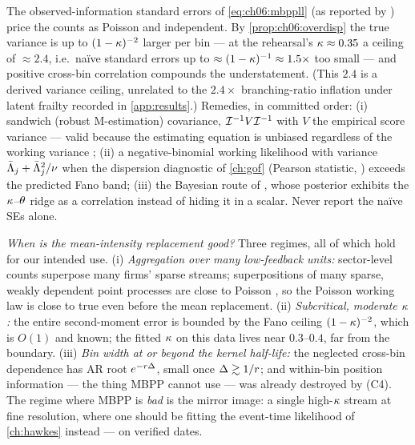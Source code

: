 \begin{warning}\label{warn:ch06:optimisticse}
The observed-information standard errors of \cref{eq:ch06:mbppll} (as
reported by ) price the counts as Poisson and
independent. By \cref{prop:ch06:overdisp} the true variance is up to
$(1-\kappa)^{-2}$ larger per bin --- at the rehearsal's
$\kappa\approx0.35$ a ceiling of $\approx 2.4$, i.e.\ na\"ive standard
errors up to $\approx (1-\kappa)^{-1}\approx1.5\times$ too small --- and
positive cross-bin correlation compounds the understatement. (This
$2.4$ is a derived variance ceiling, unrelated to the $2.4\times$
branching-ratio inflation under latent frailty recorded in
\cref{app:results}.) Remedies, in committed order: (i) sandwich
(robust M-estimation) covariance, $\mathcal{I}^{-1} V \mathcal{I}^{-1}$ with $V$
the empirical score variance --- valid because the estimating equation is
unbiased regardless of the working variance \citep[Ch.~5]{vandervaart1998};
(ii) a negative-binomial working likelihood with variance
$\bar{\Lambda}_j + \bar{\Lambda}_j^2/\nu$ when the dispersion diagnostic of
\cref{ch:gof} (Pearson statistic, ) exceeds the
predicted Fano band; (iii) the Bayesian route of ,
whose posterior exhibits the $\kappa$--$\theta$ ridge as a correlation
instead of hiding it in a scalar. Never report the na\"ive SEs alone.
\end{warning}

\emph{When is the mean-intensity replacement good?} Three regimes, all of
which hold for our intended use. (i) \emph{Aggregation over many
low-feedback units:} sector-level counts superpose many firms' sparse
streams; superpositions of many sparse, weakly dependent point processes
are close to Poisson \citep[Ch.~9]{daley2003}, so the Poisson working law
is close to true even before the mean replacement. (ii) \emph{Subcritical,
moderate $\kappa$:} the entire second-moment error is bounded by the Fano
ceiling $(1-\kappa)^{-2}$, which is $O(1)$ and known; the fitted
$\kappa$ on this data lives near $0.3$--$0.4$, far from the boundary.
(iii) \emph{Bin width at or beyond the kernel half-life:} the neglected
cross-bin dependence has AR root $e^{-r\Delta}$, small once
$\Delta \gtrsim 1/r$; and within-bin position information --- the thing
MBPP cannot use --- was already destroyed by (C4). The regime where MBPP is
\emph{bad} is the mirror image: a single high-$\kappa$ stream at fine
resolution, where one should be fitting the event-time likelihood of
\cref{ch:hawkes} instead --- on verified dates.

